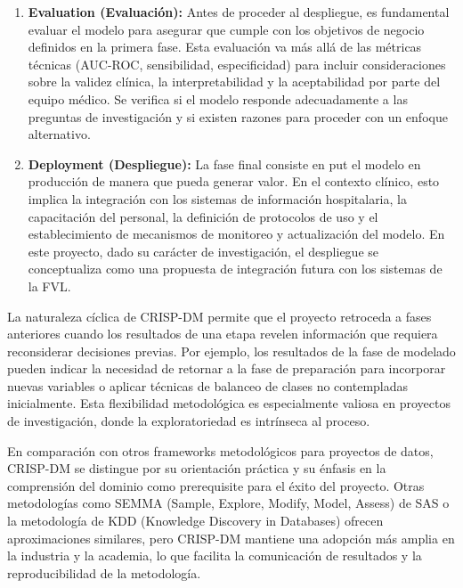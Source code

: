 \begin{enumerate}
    \item \textbf{Evaluation (Evaluación):} Antes de proceder al despliegue, es fundamental evaluar el modelo para asegurar que cumple con los objetivos de negocio definidos en la primera fase. Esta evaluación va más allá de las métricas técnicas (AUC-ROC, sensibilidad, especificidad) para incluir consideraciones sobre la validez clínica, la interpretabilidad y la aceptabilidad por parte del equipo médico. Se verifica si el modelo responde adecuadamente a las preguntas de investigación y si existen razones para proceder con un enfoque alternativo.
    
    \item \textbf{Deployment (Despliegue):} La fase final consiste en put el modelo en producción de manera que pueda generar valor. En el contexto clínico, esto implica la integración con los sistemas de información hospitalaria, la capacitación del personal, la definición de protocolos de uso y el establecimiento de mecanismos de monitoreo y actualización del modelo. En este proyecto, dado su carácter de investigación, el despliegue se conceptualiza como una propuesta de integración futura con los sistemas de la FVL.
\end{enumerate}

La naturaleza cíclica de CRISP-DM permite que el proyecto retroceda a fases anteriores cuando los resultados de una etapa revelen información que requiera reconsiderar decisiones previas. Por ejemplo, los resultados de la fase de modelado pueden indicar la necesidad de retornar a la fase de preparación para incorporar nuevas variables o aplicar técnicas de balanceo de clases no contempladas inicialmente. Esta flexibilidad metodológica es especialmente valiosa en proyectos de investigación, donde la exploratoriedad es intrínseca al proceso.

En comparación con otros frameworks metodológicos para proyectos de datos, CRISP-DM se distingue por su orientación práctica y su énfasis en la comprensión del dominio como prerequisite para el éxito del proyecto. Otras metodologías como SEMMA (Sample, Explore, Modify, Model, Assess) de SAS o la metodología de KDD (Knowledge Discovery in Databases) ofrecen aproximaciones similares, pero CRISP-DM mantiene una adopción más amplia en la industria y la academia, lo que facilita la comunicación de resultados y la reproducibilidad de la metodología.

\newpage


